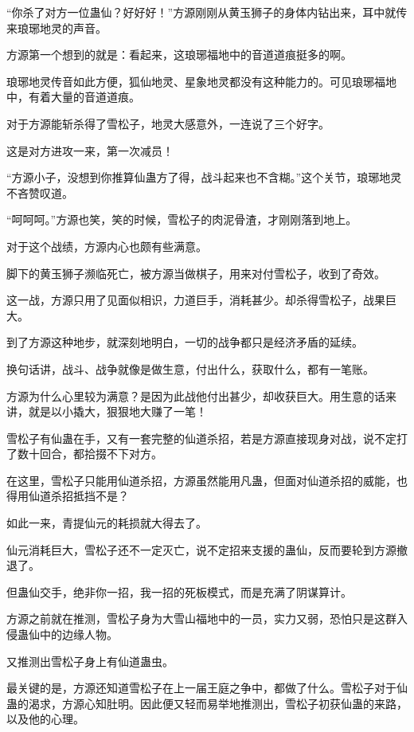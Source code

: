 
\begin{this_body}

“你杀了对方一位蛊仙？好好好！”方源刚刚从黄玉狮子的身体内钻出来，耳中就传来琅琊地灵的声音。

方源第一个想到的就是：看起来，这琅琊福地中的音道道痕挺多的啊。

琅琊地灵传音如此方便，狐仙地灵、星象地灵都没有这种能力的。可见琅琊福地中，有着大量的音道道痕。

对于方源能斩杀得了雪松子，地灵大感意外，一连说了三个好字。

这是对方进攻一来，第一次减员！

“方源小子，没想到你推算仙蛊方了得，战斗起来也不含糊。”这个关节，琅琊地灵不吝赞叹道。

“呵呵呵。”方源也笑，笑的时候，雪松子的肉泥骨渣，才刚刚落到地上。

对于这个战绩，方源内心也颇有些满意。

脚下的黄玉狮子濒临死亡，被方源当做棋子，用来对付雪松子，收到了奇效。

这一战，方源只用了见面似相识，力道巨手，消耗甚少。却杀得雪松子，战果巨大。

到了方源这种地步，就深刻地明白，一切的战争都只是经济矛盾的延续。

换句话讲，战斗、战争就像是做生意，付出什么，获取什么，都有一笔账。

方源为什么心里较为满意？是因为此战他付出甚少，却收获巨大。用生意的话来讲，就是以小撬大，狠狠地大赚了一笔！

雪松子有仙蛊在手，又有一套完整的仙道杀招，若是方源直接现身对战，说不定打了数十回合，都拾掇不下对方。

在这里，雪松子只能用仙道杀招，方源虽然能用凡蛊，但面对仙道杀招的威能，也得用仙道杀招抵挡不是？

如此一来，青提仙元的耗损就大得去了。

仙元消耗巨大，雪松子还不一定灭亡，说不定招来支援的蛊仙，反而要轮到方源撤退了。

但蛊仙交手，绝非你一招，我一招的死板模式，而是充满了阴谋算计。

方源之前就在推测，雪松子身为大雪山福地中的一员，实力又弱，恐怕只是这群入侵蛊仙中的边缘人物。

又推测出雪松子身上有仙道蛊虫。

最关键的是，方源还知道雪松子在上一届王庭之争中，都做了什么。雪松子对于仙蛊的渴求，方源心知肚明。因此便又轻而易举地推测出，雪松子初获仙蛊的来路，以及他的心理。


\end{this_body}
